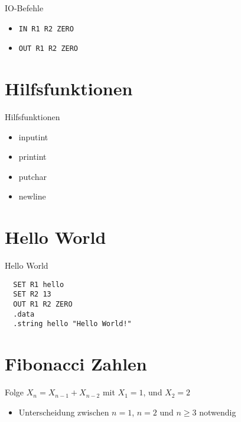 \begin{frame}{IO-Befehle}
 \begin{itemize}
  \item \texttt{IN R1 R2 ZERO}
  \item \texttt{OUT R1 R2 ZERO}
 \end{itemize}
\end{frame}






\section{Hilfsfunktionen}

\begin{frame}{Hilfsfunktionen}
 \begin{itemize}
  \item inputint
  \item printint
  \item putchar
  \item newline
 \end{itemize}
\end{frame}



\section{Hello World}

\begin{frame}[fragile]{Hello World}
 \begin{lstlisting}
  SET R1 hello
  SET R2 13
  OUT R1 R2 ZERO
  .data
  .string hello "Hello World!"
 \end{lstlisting}
\end{frame}


\section{Fibonacci Zahlen}

\begin{frame}{\insertsection}%
 Folge $X_{n} = X_{n-1} + X_{n-2}$
 mit $X_{1} = 1$, und $X_{2} = 2$
 \begin{itemize}
 \item Unterscheidung zwischen $n = 1$, $n = 2$ und $n \geq 3$ notwendig
 \end{itemize}
\end{frame}



